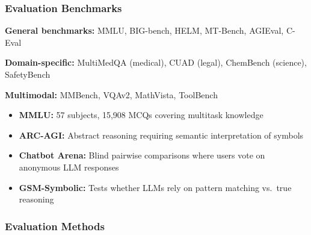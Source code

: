 \bigseparator

\subsubsection{Evaluation Benchmarks}

\begin{defbox}
\textbf{General benchmarks:} MMLU, BIG-bench, HELM, MT-Bench, AGIEval, C-Eval

\textbf{Domain-specific:} MultiMedQA (medical), CUAD (legal), ChemBench (science), SafetyBench

\textbf{Multimodal:} MMBench, VQAv2, MathVista, ToolBench
\end{defbox}

\begin{exbox}
\begin{itemize}
  \item \textbf{MMLU:} 57 subjects, 15,908 MCQs covering multitask knowledge
  \item \textbf{ARC-AGI:} Abstract reasoning requiring semantic interpretation of symbols
  \item \textbf{Chatbot Arena:} Blind pairwise comparisons where users vote on anonymous LLM responses
  \item \textbf{GSM-Symbolic:} Tests whether LLMs rely on pattern matching vs.\ true reasoning
\end{itemize}
\end{exbox}

\bigseparator

\subsubsection{Evaluation Methods}

